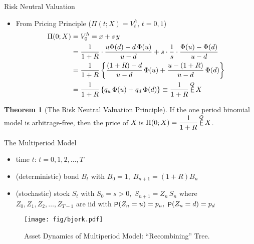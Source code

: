 \documentclass[10pt,handout]{beamer}
\newcommand{\ds}{\displaystyle}
\DeclareMathOperator\prb{{\sf P}}
\DeclareMathOperator\expc{{\sf E}}
\theoremstyle{definition}
\newtheorem*{thm}{Theorem}
\begin{document}
\begin{frame}{Risk Neutral Valuation}
  \begin{itemize}
    \item From Pricing Principle ($\Pi(t; X) = V_t^h,\, t=0,1$)
      \begin{align*}
        \Pi(0; X) &= V_0^h = x + s\,y \\
                  &= \frac{1}{1+R}\cdot\frac{u\Phi(d)-d\,\Phi(u)}{u-d} + s\cdot\frac{1}{s}\cdot\frac{\Phi(u)-\Phi(d)}{u-d} \\
                  &= \frac{1}{1+R}\left\{\frac{(1+R)-d}{u-d}\,\Phi(u) + \frac{u-(1+R)}{u-d}\,\Phi(d)\right\}\\
                  &= \frac{1}{1+R}\left\{q_u\,\Phi(u) + q_d\,\Phi(d)\right\} \equiv \frac{1}{1+R}\expc^Q X
      \end{align*}
  \end{itemize}
  \begin{thm}[The Risk Neutral Valuation Principle]
    If the one period binomial model is arbitrage-free, then the price of $X$ is $\ds\Pi(0; X) = \frac{1}{1+R}\expc^Q X$.
  \end{thm}
\end{frame}

\begin{frame}{The Multiperiod Model}
  \begin{itemize}
    \item time $t$: $t=0, 1, 2, \ldots, T$ 
    \item (deterministic) bond $B_t$ with $\ds B_0 = 1,\; B_{n+1} = (1 + R)B_n$
    \item (stochastic) stock $S_t$ with $\ds S_0 = s > 0,\; S_{n+1} = Z_n\,S_n$ where $Z_0, Z_1, Z_2,\ldots, Z_{T-1}$ are iid with $\ds\prb(Z_n=u) = p_u,\;\prb(Z_n=d) = p_d$
  \end{itemize}
  \begin{figure}[!htbp]
    \centering
    \texttt{[image: fig/bjork.pdf]}
    \vspace{-3mm}
    \caption{Asset Dynamics of Multiperiod Model: ``Recombining'' Tree.}
    \label{fig:bn3}
  \end{figure}
\end{frame}
\end{document}
